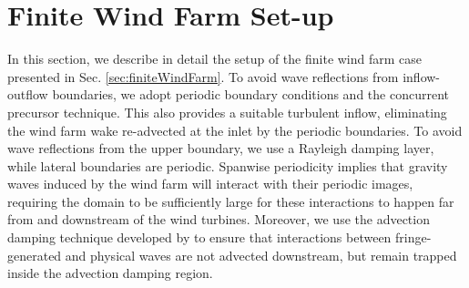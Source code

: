 \documentclass[journal abbreviation, manuscript]{copernicus}
\begin{document}
\section{Finite Wind Farm Set-up}    %
\label{app:finiteWindFarmCaseSetup}
In this section, we describe in detail the setup of the finite wind farm case presented in Sec. \ref{sec:finiteWindFarm}. To avoid wave reflections from inflow-outflow boundaries, we adopt periodic boundary conditions and the concurrent precursor technique. This also provides a suitable turbulent inflow, eliminating the wind farm wake re-advected at the inlet by the periodic boundaries. To avoid wave reflections from the upper boundary, we use a Rayleigh damping layer, while lateral boundaries are periodic. Spanwise periodicity implies that gravity waves induced by the wind farm will interact with their periodic images, requiring the domain to be sufficiently large for these interactions to happen far from and downstream of the wind turbines. Moreover, we use the advection damping technique developed by \cite{2022a_LanzilaoMeyers} to ensure that interactions between fringe-generated and physical waves are not advected downstream, but remain trapped inside the advection damping region. \\
\end{document}
